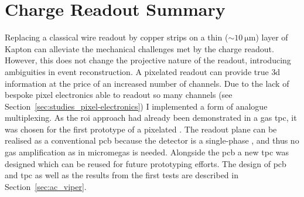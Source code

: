 \section{Charge Readout Summary}
\label{sec:studies_charge-ro-summary}

Replacing a classical wire readout by copper strips on a thin ($\sim \SI{10}{\micro\metre}$) layer of Kapton can alleviate the mechanical challenges met by the charge readout.
However, this does not change the projective nature of the readout, introducing ambiguities in event reconstruction.
A pixelated readout can provide true \gls{3d} information at the price of an increased number of channels.
Due to the lack of bespoke pixel electronics able to readout so many channels (see Section~\ref{sec:studies_pixel-electronics}) I implemented a form of analogue multiplexing.
As the \gls{roi} approach had already been demonstrated in a gas \gls{tpc}, it was chosen for the first prototype of a pixelated \lartpc{}.
The readout plane can be realised as a conventional \gls{pcb} because the detector is a single-phase \lartpc{}, and thus no gas amplification as in \gls{micromegas} is needed.
Alongside the \gls{pcb} a new \gls{tpc} was designed which can be reused for future prototyping efforts.
The design of \gls{pcb} and \gls{tpc} as well as the results from the first tests are described in Section~\ref{sec:ac_viper}.